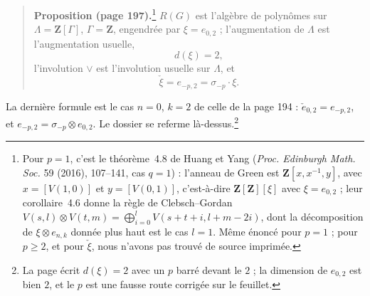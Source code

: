 \documentclass[11pt,a4paper]{article}
\begin{document}
\begin{quote}
\textbf{Proposition (page 197).}\footnote{Pour $p = 1$, c'est le
théorème~4.8 de Huang et Yang (\emph{Proc. Edinburgh Math. Soc.} 59 (2016),
107--141, cas $q = 1$) : l'anneau de Green est $\mathbf{Z}[x, x^{-1}, y]$, avec
$x = [V(1,0)]$ et $y = [V(0,1)]$, c'est-à-dire $\mathbf{Z}[\mathbf{Z}][\xi]$
avec $\xi = e_{0,2}$ ; leur corollaire~4.6 donne la règle de Clebsch--Gordan
$V(s,l) \otimes V(t,m) = \bigoplus_{i=0}^{l} V(s+t+i, l+m-2i)$, dont la
décomposition de $\xi \otimes e_{n,k}$ donnée plus haut est le cas $l = 1$. Même énoncé
pour $p = 1$ ; pour $p \geqslant 2$, et pour $\check{\xi}$, nous n'avons pas
trouvé de source imprimée.} $R(G)$ est l'algèbre de polynômes sur
$\Lambda = \mathbf{Z}[\Gamma]$, $\Gamma = \mathbf{Z}$, engendrée par
$\xi = e_{0,2}$ ; l'augmentation de $\Lambda$ est l'augmentation usuelle,
\[
d(\xi) = 2 ,
\]
l'involution $\vee$ est l'involution usuelle sur $\Lambda$, et
\[
\check{\xi} = e_{-p,2} = \sigma_{-p} \cdot \xi .
\]
\end{quote}
La dernière formule est le cas $n = 0$, $k = 2$ de celle de la page 194 :
$\check{e}_{0,2} = e_{-p,2}$, et $e_{-p,2} = \sigma_{-p} \otimes e_{0,2}$. Le
dossier se referme là-dessus.\footnote{La page écrit $d(\xi) = 2$ avec un $p$
barré devant le $2$ ; la dimension de $e_{0,2}$ est bien $2$, et le $p$ est une
fausse route corrigée sur le feuillet.}
\end{document}
